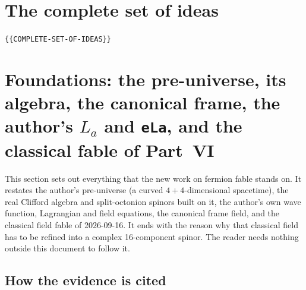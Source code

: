 \section{The complete set of ideas}
\label{sec:1}

\texttt{\{\{COMPLETE-SET-OF-IDEAS\}\}}

\begingroup\sloppy

\section[Foundations: the pre-universe, its algebra, the canonical frame, the author's La and eLa, and the classical fable of Part VI]{Foundations: the pre-universe, its algebra, the canonical frame, the author's \texorpdfstring{$L_a$}{La} and \texttt{eLa}, and the classical fable of Part~VI}
\label{fnd:sec}\label{sec:2}

This section sets out everything that the new work on fermion fable stands on. It restates the
author's pre-universe (a curved $4+4$-dimensional spacetime), the real Clifford algebra and
split-octonion spinors built on it, the author's own wave function, Lagrangian and field
equations, the canonical frame field, and the classical field fable of 2026-09-16. It ends with
the reason why that classical field has to be refined into a complex 16-component spinor. The
reader needs nothing outside this document to follow it.

\subsection{How the evidence is cited}
\label{fnd:evidence}\label{sec:2.1}

